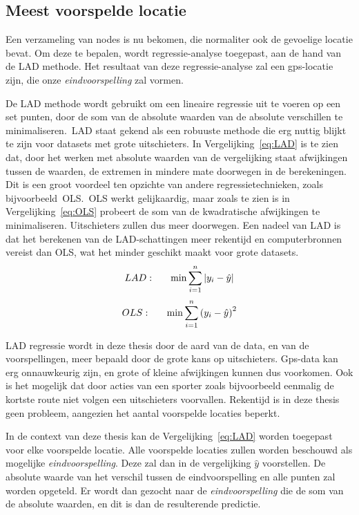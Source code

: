\subsection{Meest voorspelde locatie}
Een verzameling van nodes is nu bekomen, die normaliter ook de gevoelige
locatie bevat. Om deze te bepalen, wordt regressie-analyse toegepast, aan de
hand van de \ac{LAD} methode. Het resultaat van deze regressie-analyse zal een
\ac{gps}-locatie zijn, die onze \textit{eindvoorspelling} zal vormen.

De \ac{LAD} methode wordt gebruikt om een lineaire regressie uit te voeren op
een set punten, door de som van de absolute waarden van de absolute verschillen
te minimaliseren.\ \ac{LAD} staat gekend als een robuuste methode die erg
nuttig blijkt te zijn voor datasets met grote uitschieters. In
Vergelijking~\ref{eq:LAD} is te zien dat, door het werken met absolute waarden
van de vergelijking staat afwijkingen tussen de waarden, de extremen in mindere
mate doorwegen in de berekeningen. Dit is een groot voordeel ten opzichte van
andere regressietechnieken, zoals
bijvoorbeeld~\ac{OLS}\cite{iqbal2021application}.~\ac{OLS} werkt gelijkaardig,
maar zoals te zien is in Vergelijking~\ref{eq:OLS} probeert de som van de
kwadratische afwijkingen te minimaliseren. Uitschieters zullen dus meer
doorwegen. Een nadeel van \ac{LAD} is dat het berekenen van de LAD-schattingen
meer rekentijd en computerbronnen vereist dan \ac{OLS}, wat het minder geschikt
maakt voor grote datasets.
\begin{equation} \label{eq:LAD}
    LAD:\indent  \min\sum\limits_{i=1}^n|y_i - \hat{y}|
\end{equation}
\begin{equation} \label{eq:OLS}
    OLS:\indent  \min\sum\limits_{i=1}^n{(y_i - \hat{y})}^2
\end{equation}

LAD regressie wordt in deze thesis door de aard van de data, en van de
voorspellingen, meer bepaald door de grote kans op uitschieters. Gps-data kan
erg onnauwkeurig zijn, en grote of kleine afwijkingen kunnen dus voorkomen. Ook
is het mogelijk dat door acties van een sporter zoals bijvoorbeeld eenmalig de
kortste route niet volgen een uitschieters voorvallen. Rekentijd is in deze
thesis geen probleem, aangezien het aantal voorspelde locaties beperkt.

In de context van deze thesis kan de Vergelijking~\ref{eq:LAD} worden toegepast
voor elke voorspelde locatie. Alle voorspelde locaties zullen worden beschouwd
als mogelijke \textit{eindvoorspelling}. Deze zal dan in de vergelijking
$\hat{y}$ voorstellen. De absolute waarde van het verschil tussen de
eindvoorspelling en alle punten zal worden opgeteld. Er wordt dan gezocht naar
de \textit{eindvoorspelling} die de som van de absolute waarden, en dit is dan
de resulterende predictie.